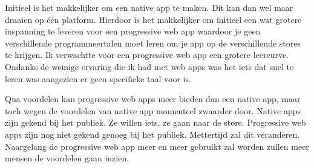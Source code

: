 Initieel is het makkelijker om een native app te maken. Dit kan dan wel maar draaien op één platform. Hierdoor is het makkelijker om initieel een wat grotere inspanning te leveren voor een progressive web app waardoor je geen verschillende programmeertalen moet leren om je app op de  verschillende stores te krijgen.
Ik verwachtte voor een progressive web app een grotere leercurve. Ondanks de weinige ervaring die ik had met web apps was het iets dat snel te leren was aangezien er geen specifieke taal voor is. 

Qua voordelen kan progressive web apps meer bieden dan een native app, maar toch wegen de voordelen van native app momenteel zwaarder door. Native apps zijn gekend bij het publiek. Ze willen iets, ze gaan naar de store. Progressive web apps zijn nog niet gekend genoeg bij het publiek. Mettertijd zal dit veranderen. Naargelang de progressive web app meer en meer gebruikt zal worden zullen meer mensen de voordelen gaan inzien. 


